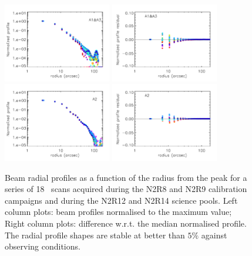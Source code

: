 \begin{figure}[ht!]
   \includegraphics[clip, width=0.42\textwidth]{Figures/Beams/plot_profiles_1mm.pdf}
   \includegraphics[clip, width=0.42\textwidth]{Figures/Beams/plot_profile_diff_wrt_median_1mm.pdf}
   \includegraphics[clip, width=0.42\textwidth]{Figures/Beams/plot_profiles_a2.pdf}
   \includegraphics[clip, width=0.42\textwidth]{Figures/Beams/plot_profile_diff_wrt_median_a2.pdf}
  \caption[Stability of the beam profile]{Beam radial profiles as a
    function of the radius from the peak for a series of 18
    \bm\ scans acquired during the N2R8 and N2R9 calibration campaigns and
    during the N2R12 and N2R14 science pools. Left column plots: 
    beam profiles normalised to the maximum value; Right column plots: difference w.r.t. the median normalised profile. The radial profile shapes are stable at better than $5\%$ against observing conditions.}
  \label{fig:beam_prof}
\end{figure}

